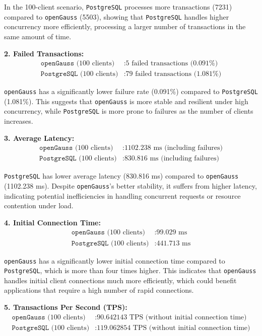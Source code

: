 \documentclass[12pt,a4paper,cs4size]{ctexart}
\begin{document}
In the 100-client scenario, \texttt{PostgreSQL} processes more transactions (7231) compared to \texttt{openGauss} (5503), showing that \texttt{PostgreSQL} handles higher concurrency more efficiently, processing a larger number of transactions in the same amount of time.

\textbf{2. Failed Transactions:}
\[
\begin{aligned}
    \texttt{openGauss}\text{ (100 clients)}&: \text{5 failed transactions (0.091\%)}\\
    \texttt{PostgreSQL}\text{ (100 clients)}&: \text{79 failed transactions (1.081\%)}
\end{aligned}
\]

\texttt{openGauss} has a significantly lower failure rate (0.091\%) compared to \texttt{PostgreSQL} (1.081\%). This suggests that \texttt{openGauss} is more stable and resilient under high concurrency, while \texttt{PostgreSQL} is more prone to failures as the number of clients increases.

\textbf{3. Average Latency:}
\[
\begin{aligned}
    \texttt{openGauss}\text{ (100 clients)}&: \text{1102.238 ms (including failures)}\\
    \texttt{PostgreSQL}\text{ (100 clients)}&: \text{830.816 ms (including failures)}
\end{aligned}
\]

\texttt{PostgreSQL} has lower average latency (830.816 ms) compared to \texttt{openGauss} (1102.238 ms). Despite \texttt{openGauss}'s better stability, it suffers from higher latency, indicating potential inefficiencies in handling concurrent requests or resource contention under load.

\textbf{4. Initial Connection Time:}
\[
\begin{aligned}
    \texttt{openGauss}\text{ (100 clients)}&: \text{99.029 ms}\\
    \texttt{PostgreSQL}\text{ (100 clients)}&: \text{441.713 ms}
\end{aligned}
\]

\texttt{openGauss} has a significantly lower initial connection time compared to \texttt{PostgreSQL}, which is more than four times higher. This indicates that \texttt{openGauss} handles initial client connections much more efficiently, which could benefit applications that require a high number of rapid connections.

\textbf{5. Transactions Per Second (TPS):}
\[
\begin{aligned}
    \texttt{openGauss}\text{ (100 clients)}&: \text{90.642143 TPS (without initial connection time)}\\
    \texttt{PostgreSQL}\text{ (100 clients)}&: \text{119.062854 TPS (without initial connection time)}
\end{aligned}
\]
\end{document}
